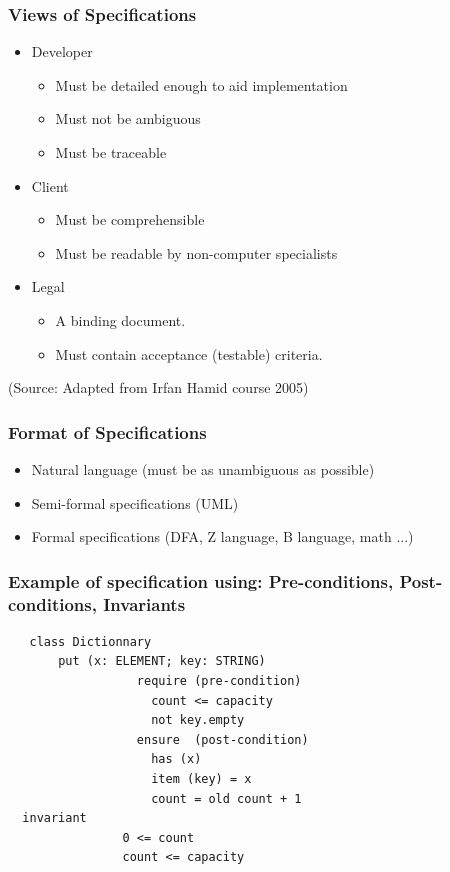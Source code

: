\documentclass[10pt]{beamer}
\begin{document}
\begin{frame}[fragile]
  \frametitle{Views of Specifications}
  \begin{itemize}
  \item Developer
    \begin{itemize}
    \item Must be detailed enough to aid implementation
    \item Must not be ambiguous
    \item Must be traceable
    \end{itemize}
  \item Client
    \begin{itemize}
    \item Must be comprehensible
    \item Must be readable by non-computer specialists
    \end{itemize}
  \item  Legal
    \begin{itemize}
    \item A binding document.
    \item Must contain acceptance (testable) criteria.
    \end{itemize}
  \end{itemize}
  \tiny (Source: Adapted from Irfan Hamid course 2005)
\end{frame}

\begin{frame}[fragile]
  \frametitle{Format of Specifications}
  \begin{itemize}
  \item Natural language (must be as unambiguous as possible)
  \item Semi-formal specifications (UML)
  \item Formal specifications (DFA, Z language, B language, math ...)
  \end{itemize}
\end{frame}

\begin{frame}[fragile]
  \frametitle{Example of specification using: Pre-conditions, Post-conditions, Invariants}
  \begin{verbatim}
   class Dictionnary
       put (x: ELEMENT; key: STRING)
                  require (pre-condition)
                    count <= capacity
                    not key.empty
                  ensure  (post-condition)
                    has (x)
                    item (key) = x
                    count = old count + 1
  invariant
                0 <= count
                count <= capacity
  \end{verbatim}
\end{frame}
\end{document}
